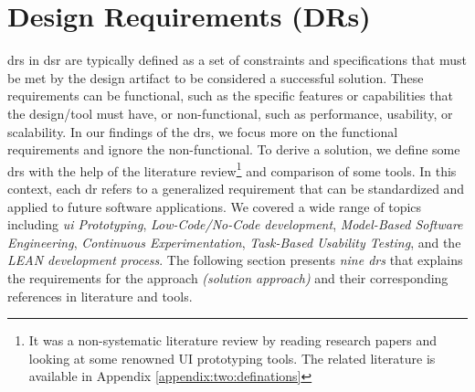 \section{Design Requirements (DRs)}
\label{design:section:designReqs}
\ac{dr}s in \ac{dsr} are typically defined as a set of constraints and specifications that must be met by the design artifact to be considered a successful solution. 
These requirements can be functional, such as the specific features or capabilities that the design/tool must have, or non-functional, such as performance, usability, or scalability.
In our findings of the \ac{dr}s, we focus more on the functional requirements and ignore the non-functional.
To derive a solution, we define some \ac{dr}s with the help of the literature review\footnote{It was a non-systematic literature review by reading research papers and looking at some renowned UI prototyping tools. The related literature is available in Appendix \ref{appendix:two:definations}} and comparison of some tools.
In this context, each \ac{dr} refers to a generalized requirement that can be standardized and applied to future software applications.
We covered a wide range of topics including \textit{\ac{ui} Prototyping}, \textit{Low-Code/No-Code development}, \textit{Model-Based Software Engineering}, \textit{Continuous Experimentation}, \textit{Task-Based Usability Testing}, and the \textit{LEAN development process}.
The following section presents \textit{nine \ac{dr}s} that explains the requirements for the approach \textit{(solution approach)} and their corresponding references in literature and tools.
